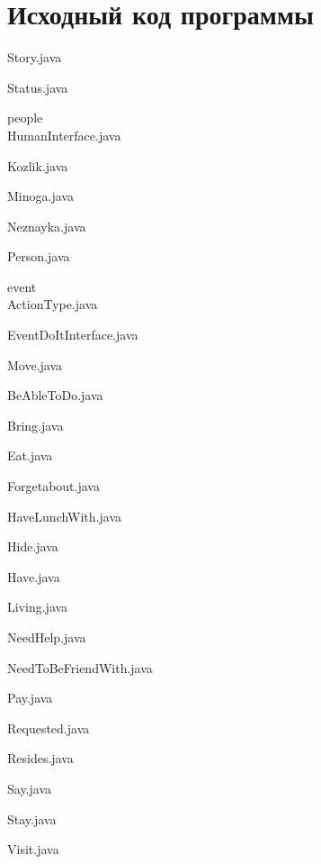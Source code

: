 \documentclass[12pt,onecolumn]{article}
\begin{document}
\section{Исходный код программы}
Story.java

Status.java

people\\
HumanInterface.java

Kozlik.java

Minoga.java

Neznayka.java

Person.java

event\\
ActionType.java

EventDoItInterface.java

Move.java

BeAbleToDo.java

Bring.java

Eat.java

Forgetabout.java

HaveLunchWith.java

Hide.java

Have.java

Living.java

NeedHelp.java

NeedToBeFriendWith.java

Pay.java

Requested.java

Resides.java

Say.java

Stay.java

Visit.java

\end{document}
